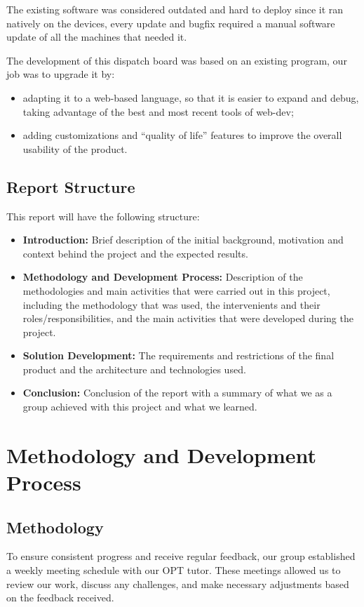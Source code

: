 \documentclass{article}
\begin{document}
The existing software was considered outdated and hard to deploy since it ran natively on the devices, every update and bugfix required a manual software update of all the machines that needed it. 

The development of this dispatch board was based on an existing program, our job was to upgrade it by:
\begin{itemize}
    \item adapting it to a web-based language, so that it is easier to expand and debug, taking advantage of the best and most recent tools of web-dev;
    \item adding customizations and “quality of life” features to improve the overall usability of the product.
\end{itemize}

\subsection{Report Structure}
This report will have the following structure:
\begin{itemize}
    \item     \textbf{Introduction:} Brief description of the initial background, motivation and context behind the project and the expected results.
    \item     \textbf{Methodology and Development Process:} Description of the methodologies and main activities that were carried out in this project, including the methodology that was used, the intervenients and their roles/responsibilities, and the main activities that were developed during the project.
    \item     \textbf{Solution Development:} The requirements and restrictions of the final product and the architecture and technologies used.
    \item     \textbf{Conclusion:} Conclusion of the report with a summary of what we as a group achieved with this project and what we learned.
\end{itemize}

\section{Methodology and Development Process}

\subsection{Methodology}
To ensure consistent progress and receive regular feedback, our group established a weekly meeting schedule with our OPT tutor. These meetings allowed us to review our work, discuss any challenges, and make necessary adjustments based on the feedback received.
\end{document}
